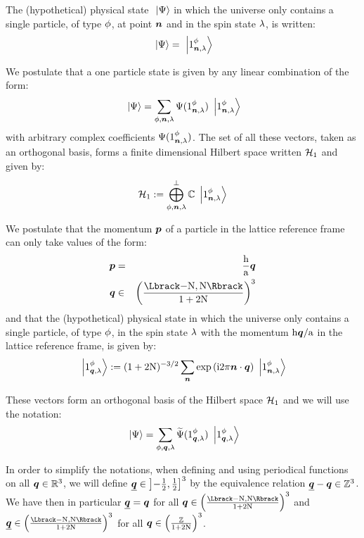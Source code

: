 \documentclass[10pt,a4paper,twoside,openany]{book}
\begin{document}
 The (hypothetical) physical state $\ket{\Psi}$ in which the universe only contains a single particle, of type $\pt$, at point $\n$ and in the spin state $\sp$, is written:
\begin{equation*}
\ket{\Psi} = \ketX 1 \pt \n \sp
\end{equation*}

We postulate that a one particle state is given by any linear combination of the form:
\begin{equation*}
\ket{\Psi} = \sum_{\pt,\n,\sp} \Psi(\bX 1 \pt \n \sp) \ketX 1 \pt \n \sp
\end{equation*}
with arbitrary complex coefficients $\Psi(\bX 1 \pt \n \sp)$. The set of all these vectors, taken as an orthogonal basis, forms a finite dimensional Hilbert space written $\Hn 1$ and given by:
\begin{equation*}
\Hn 1 \eqdef \bigoplus^\perp_{\pt,\n,\sp} \IC \ketX 1 \pt \n \sp
\end{equation*}

 We postulate that the momentum $\p$ of a particle in the lattice reference frame can only take values of the form:
\begin{eqnarray*}
\p & = & \frac \h \a \q\\
\q & \in & \FLD
\end{eqnarray*}
and that the (hypothetical) physical state in which the universe only contains a single particle, of type $\pt$, in the spin state $\sp$ with the momentum $\h\q / \a$ in the lattice reference frame, is given by:
\begin{equation*}
\ketQ 1 \pt \q \sp \eqdef (1+2 \N)^{-3/2} \sum_{\n} \exp{\i 2 \pi \n \ssp \q} \ketX 1 \pt \n \sp
\end{equation*}

These vectors form an orthogonal basis of the Hilbert space $\Hn 1$ and we will use the notation:
\begin{equation*}
\ket\Psi = \sum_{\pt,\q,\sp} \FT\Psi(\bQ 1 \pt \q \sp) \ketQ 1 \pt \q \sp
\end{equation*}

 In order to simplify the notations, when defining and using periodical functions on all $\q \in \IR^3$, we will define $\eqp \q \in \left]-\frac 1 2,\frac 1 2\right]^3$ by the equivalence relation $\eqp \q - \q \in \IZ^3$. We have then in particular $\eqp \q = \q$ for all $\q \in \FLD$ and $\eqp \q \in \FLD$ for all $\q \in \ILD$.
\end{document}
